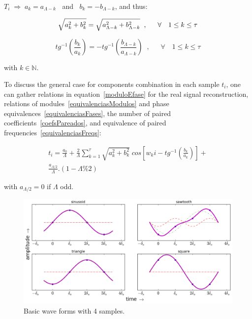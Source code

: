 $T_i \; \Rightarrow \; a_k = a_{\Lambda -k}\;\;$ and $\;\;b_k = - b_{\Lambda -k}$, and thus:

\begin{equation}\label{equivalenciasModulos}
\sqrt{a_k^2 + b_k^2} = \sqrt{a_{\Lambda - k}^2 + b_{\Lambda -k}^2} \;\;, \quad \;\; \forall \quad 1 \leq k \leq \tau  \\
\end{equation}

\begin{equation}\label{equivalenciasFases}
tg^{-1}\left(\frac{b_k}{a_k}\right)=-tg^{-1}\left(\frac{b_{\Lambda -k}}{a_{\Lambda - k}}\right)\;\;,\quad \;\; \forall \quad 1 \leq k \leq \tau
\end{equation}

\noindent with $k \in \mathbb{N}$.

To discuss the general case for components combination in each sample $t_i$, one can gather relations in equation~\ref{moduloEfase} for the real signal reconstruction, relations of modules~\ref{equivalenciasModulos} and phase equivalences~\ref{equivalenciasFases}, the number of paired coefficients~\ref{coefsPareados}, and equivalence of paired frequencies~\ref{equivalenciasFreqs}:

\begin{multline}\label{eq:reconsCompleta}
t_i = \frac{a_0}{\Lambda} + \frac{2}{\Lambda}\sum_{k=1}^{\tau}\sqrt{a_k^2 + b_k^2} \; cos\left[w_k i - tg^{-1}\left(\frac{b_k}{a_k}\right)\right]+ \\ \frac{ a_{\Lambda/2}}{\Lambda}.(1-\Lambda\% 2)
\end{multline}

\noindent with $a_{\Lambda/2}=0$ if $\Lambda$ odd.

\begin{figure}
    \centering
        \includegraphics[width=.9\textwidth]{figures/amostras4formas___}
    \caption{Basic wave forms with 4 samples.}
        \label{fig:formas4}
\end{figure}


